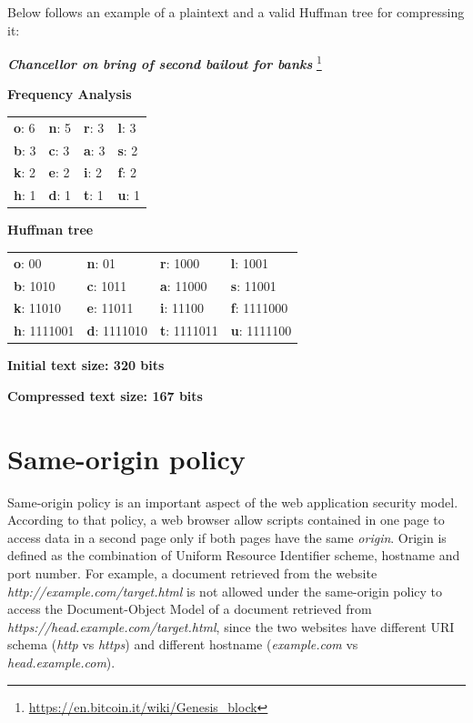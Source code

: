 Below follows an example of a plaintext and a valid Huffman tree for compressing
it:

\bigskip \centerline{\textit{\textbf{Chancellor on bring of second bailout for
banks}} \footnote{\url{https://en.bitcoin.it/wiki/Genesis_block}}}

\bigskip \centerline{\textbf{Frequency Analysis}}

\begin{table}[H] \centering \begin{tabular}{ | l | l | l | l | } \hline
\textbf{o}: 6 & \textbf{n}: 5 & \textbf{r}: 3 & \textbf{l}: 3 \\ \textbf{b}: 3 &
\textbf{c}: 3 & \textbf{a}: 3 & \textbf{s}: 2 \\ \textbf{k}: 2 & \textbf{e}: 2 &
\textbf{i}: 2 & \textbf{f}: 2 \\ \textbf{h}: 1 & \textbf{d}: 1 & \textbf{t}: 1 &
\textbf{u}: 1 \\ \hline \end{tabular} \end{table}

\centerline{\textbf{Huffman tree}}

\begin{table}[H] \centering \begin{tabular}{ | l | l | l | l | } \hline
\textbf{o}: 00 & \textbf{n}: 01 & \textbf{r}: 1000 & \textbf{l}: 1001 \\
\textbf{b}: 1010 & \textbf{c}: 1011 & \textbf{a}: 11000 & \textbf{s}: 11001 \\
\textbf{k}: 11010 & \textbf{e}: 11011 & \textbf{i}: 11100 & \textbf{f}: 1111000
\\ \textbf{h}: 1111001 & \textbf{d}: 1111010 & \textbf{t}: 1111011 & \textbf{u}:
1111100 \\ \hline \end{tabular} \end{table}

\centerline{\textbf{Initial text size: 320 bits}} \centerline{\textbf{Compressed
text size: 167 bits}}

\section{Same-origin policy}\label{sec:sameorigin}

Same-origin policy is an important aspect of the web application security model.
According to that policy, a web browser allow scripts contained in one page to
access data in a second page only if both pages have the same \textit{origin}.
Origin is defined as the combination of Uniform Resource Identifier scheme,
hostname and port number. For example, a document retrieved from the website
\textit{http://example.com/target.html} is not allowed under the same-origin
policy to access the Document-Object Model of a document retrieved from
\textit{https://head.example.com/target.html}, since the two websites have
different URI schema (\textit{http} vs \textit{https}) and different hostname
(\textit{example.com} vs \textit{head.example.com}).

